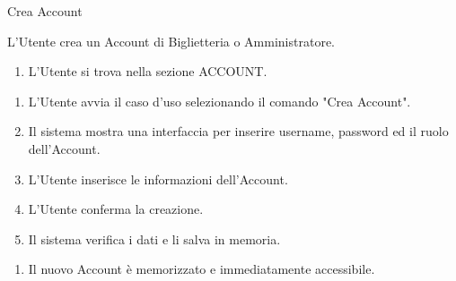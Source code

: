 {\ucTable	%
{	%
	Crea Account
	
}{	%
	
}{	%
	L'Utente crea un Account di Biglietteria o Amministratore.
	
}{	%
	\attori
	
}{	%
	\begin{enumerate}
        \item L'Utente si trova nella sezione ACCOUNT.
    \end{enumerate}
	
}{	%
	\begin{enumerate}
        \item L'Utente avvia il caso d'uso selezionando il comando "Crea Account".
        \item Il sistema mostra una interfaccia per inserire username, password ed il ruolo dell'Account.
        \item L'Utente inserisce le informazioni dell'Account.
        \item L'Utente conferma la creazione.
        \item Il sistema verifica i dati e li salva in memoria.
    \end{enumerate}
	
}{	%
	\begin{enumerate}
        \item Il nuovo Account è memorizzato e immediatamente accessibile. %
    \end{enumerate}
	
}{	%
} }


